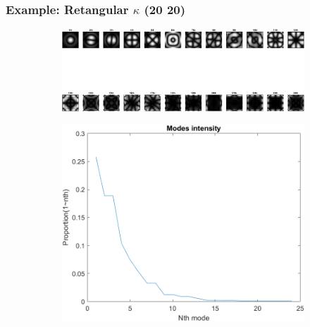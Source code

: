 \documentclass[UTF8]{beamer}
\begin{document}
\begin{frame} \frametitle{Example: Retangular $\kappa$ (20 20)}
\begin{figure}[H]
\centering
\begin{subfigure}{1\textwidth}
    \centering
    \includegraphics[width=0.9\linewidth]{../figures/ex_ave20.png}  
    \label{fig:modes_u}
 \end{subfigure}
 \begin{subfigure}{1\textwidth}
    \centering
    \includegraphics[width=.5\linewidth]{../figures/ex_ave20_s.png}  
    \label{fig:modes_u_phaze}
 \end{subfigure}
 \end{figure}
\end{frame}
\end{document}
